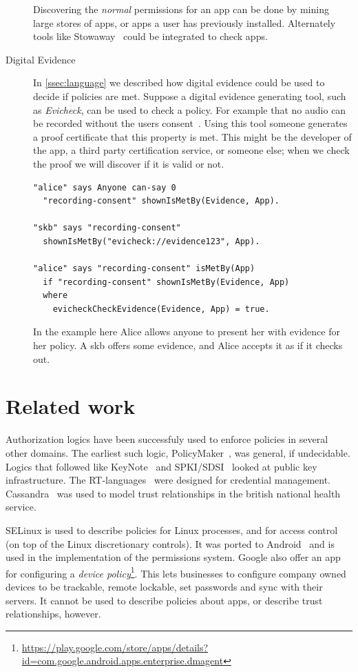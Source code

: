 \documentclass[]{scrartcl}
\begin{document}
\begin{description}
    Discovering the \emph{normal} permissions for an app can be done by mining large stores of apps, or apps a user has previously installed.
    Alternately tools like Stowaway~\citep{Felt:2011kj} could be integrated to check apps.

  \item[Digital Evidence]
    In \autoref{ssec:language} we described how digital evidence could be used to decide if policies are met.
    Suppose a digital evidence generating tool, such as \emph{Evicheck}, can be used to check a policy.
    For example that no audio can be recorded without the users consent~\citep{Seghir:2014uq}.
    Using this tool someone generates a proof certificate that this property is met.
    This might be the developer of the app, a third party certification service, or someone else;
      when we check the proof we will discover if it is valid or not.
    \begin{lstlisting}
"alice" says Anyone can-say 0
  "recording-consent" shownIsMetBy(Evidence, App).

"skb" says "recording-consent"
  shownIsMetBy("evicheck://evidence123", App).

"alice" says "recording-consent" isMetBy(App)
  if "recording-consent" shownIsMetBy(Evidence, App)
  where
    evicheckCheckEvidence(Evidence, App) = true.
    \end{lstlisting}
    In the example here Alice allows anyone to present her with evidence for her policy.
    A \ac{skb} offers some evidence, and Alice accepts it as if it checks out.
\end{description}

\section{Related work}

Authorization logics have been successfuly used to enforce policies in several other domains.
The earliest such logic, PolicyMaker~\cite{Blaze:dj}, was general, if undecidable.
Logics that followed like KeyNote~\citep{Blaze:1999fa} and SPKI/SDSI~\citep{Ellison:1999ui} looked at public key infrastructure.
The RT-languages~\citep{Li:2002if,Li:2003ix,Li:2003to} were designed for credential management.
Cassandra~\citep{Becker:2004fi} was used to model trust relationships in the british national health service.

SELinux is used to describe policies for Linux processes, and for access control (on top of the Linux discretionary controls).
It was ported to Android~\citep{Smalley:2013vl} and is used in the implementation of the permissions system.
Google also offer an app for configuring a \emph{device policy}\footnote{\url{https://play.google.com/store/apps/details?id=com.google.android.apps.enterprise.dmagent}}.
This lets businesses to configure company owned devices to be trackable, remote lockable, set passwords and sync with their servers.
It cannot be used to describe policies about apps, or describe trust relationships, however.
\end{document}
